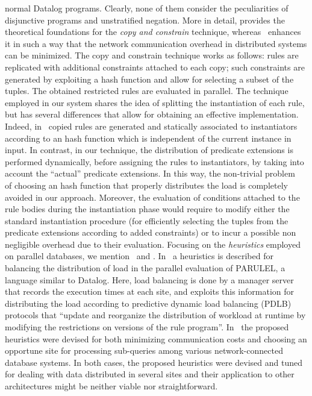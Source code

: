 \documentclass[preprint]{tlp}
\begin{document}
normal Datalog programs. Clearly, none of them consider the
peculiarities of disjunctive programs and unstratified negation.
More in detail, \cite{wolf-ozer-90} provides the theoretical
foundations for the {\em copy and constrain} technique,
whereas~\cite{zhan-etal-1995} enhances it in such a way that
the network communication overhead in distributed systems can be minimized.
The copy and constrain technique works as follows: rules are replicated
with additional constraints attached to each copy;
such constraints are generated by exploiting a hash function
and allow for selecting a subset of the tuples.
The obtained restricted rules are evaluated in parallel. The technique employed in our system
shares the idea of splitting the instantiation of each
rule, but has several differences that allow for obtaining an
effective implementation. Indeed,
in~\cite{wolf-ozer-90,zhan-etal-1995} copied rules are generated and
statically associated to instantiators according to an hash function
which is independent of the current instance in input. In contrast,
in our technique, the distribution of predicate extensions is
performed dynamically, before assigning  the rules to instantiators,
by taking into account the ``actual'' predicate extensions. In this
way, the non-trivial problem~\cite{zhan-etal-1995} of choosing an
hash function that properly distributes the load is completely
avoided in our approach. Moreover, the evaluation of conditions
attached to the rule bodies during the instantiation phase
would require to modify either the standard instantiation procedure
(for efficiently selecting the tuples from the predicate extensions according
to added constraints) or to incur a possible non negligible overhead
due to their evaluation.
Focusing on the {\em heuristics} employed on parallel databases, we
mention~\cite{dewa-etal-94} and \cite{carey-et-all-86}.
In~\cite{dewa-etal-94}  a heuristics is described for balancing the
distribution of load in the parallel evaluation of PARULEL, a
language similar to Datalog. Here, load balancing is done by a
manager server that records the execution times at each site, and
exploits this information for distributing the load according to
predictive dynamic load balancing (PDLB) protocols
that ``update and reorganize the distribution of workload at runtime
by modifying the restrictions on versions of the rule program''\cite{dewa-etal-94}.
In~\cite{carey-et-all-86} the proposed heuristics were devised for
both minimizing communication costs and choosing an opportune site
for processing sub-queries among various network-connected database
systems. In both cases, the proposed heuristics were devised and
tuned for dealing with data distributed in several sites and their
application to other architectures might be neither viable nor
straightforward.
\end{document}
